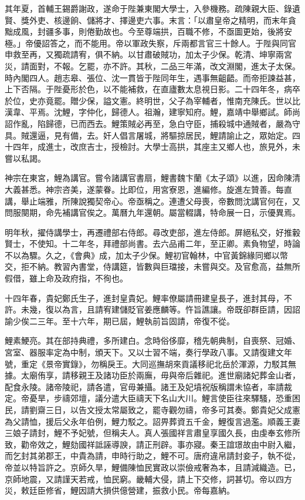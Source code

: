 \begin{pinyinscope}
其年夏，首輔王錫爵謝政，遂命于陛兼東閣大學士，入參機務。疏陳親大臣、錄遺賢、獎外吏、核邊餉、儲將才、擇邊吏六事。末言：「以肅皇帝之精明，而末年貪黜成風，封疆多事，則倦勤故也。今至尊端拱，百職不修，不亟圖更始，後將安極。」帝優詔答之，而不能用。帝以軍政失察，斥兩都言官三十餘人。于陛與同官申救至再，又獨疏請宥，俱不納。以甘肅破賊功，加太子少保。乾清、坤寧兩宮災，請面對，不報。乞罷，亦不許。其秋，二品三年滿，改文淵閣，進太子太保。時內閣四人。趙志皋、張位、沈一貫皆于陛同年生，遇事無齟齬。而帝拒諫益甚，上下否隔。于陛憂形於色，以不能補救，在直廬數太息視日影。二十四年冬，病卒於位，史亦竟罷。贈少保，謚文憲。終明世，父子為宰輔者，惟南充陳氏。世以比漢韋、平焉。沈鯉，字仲化，歸德人。祖瀚，建寧知府。鯉，嘉靖中舉鄉試。師尚詔作亂，陷歸德，已而西去。鯉策賊必再至，急白守臣，捕殺城中通賊者，嚴為守具。賊還逼，見有備，去。奸人倡言屠城，將驅掠居民，鯉請諭止之，眾始定。四十四年，成進士，改庶吉士，授檢討。大學士高拱，其座主又鄉人也，旅見外，未嘗以私謁。

神宗在東宮，鯉為講官。嘗令諸講官書扇，鯉書魏卞蘭《太子頌》以進，因命陳清大義甚悉。神宗咨美，遂蒙眷。比即位，用宮寮恩，進編修。旋進左贊善。每直講，舉止端雅，所陳說獨契帝心。帝亟稱之。連遭父母喪，帝數問沈講官何在，又問服闋期，命先補講官俟之。萬曆九年還朝。屬當輟講，特命展一日，示優異焉。

明年秋，擢侍講學士，再遷禮部右侍郎。尋改吏部，進左侍郎。屏絕私交，好推轂賢士，不使知。十二年冬，拜禮部尚書。去六品甫二年，至正卿。素負物望，時論不以為驟。久之，《會典》成，加太子少保。鯉初官翰林，中官黃錦緣同鄉以幣交，拒不納。教習內書堂，侍講筵，皆數與巨璫接，未嘗與交。及官愈高，益無所假借，雖上命及政府指，不徇也。

十四年春，貴妃鄭氏生子，進封皇貴妃。鯉率僚屬請冊建皇長子，進封其母，不許。未幾，復以為言，且請宥建儲貶官姜應麟等。忤旨譙讓。帝既卻群臣請，因詔諭少俟二三年。至十六年，期已屆，鯉執前旨固請，帝復不從。

鯉素鯁亮。其在部持典禮，多所建白。念時俗侈靡，稽先朝典制，自喪祭、冠婚、宮室、器服率定為中制，頒天下。又以士習不端，奏行學政八事。又請復建文年號，重定《景帝實錄》，勿稱戾王。大同巡撫胡來貢議移祀北岳於渾源，力駁其無據。太廟侑享，請移親王及諸功臣於兩廡，毋與帝后雜祀。進世廟諸妃葬金山者，配食永陵。諸帝陵祀，請各遣，官毋兼攝。諸王及妃墳祝版稱謂未協者，率請裁定。帝憂旱，步禱郊壇，議分遣大臣禱天下名山大川。鯉言使臣往來驛騷，恐重困民，請劉齋三日，以告文授太常屬致之，罷寺觀勿禱，帝多可其奏。鄭貴妃父成憲為父請恤，援后父永年伯例，鯉力駁之。詔畀葬資五千金，鯉復言過濫。順義王妻三娘子請封，鯉不予妃號，但稱夫人。真人張國祥言肅皇享國久長，由虔奉玄修所致，勸帝效之，鯉劾國祥詆誣導諛，請正刑辟。事亦寢。秦王誼璟故由中尉入繼，而乞封其弟郡王，中貴為請，申時行助之，鯉不可。唐府違帛請封妾子，執不從，帝並以特旨許之。京師久旱，鯉備陳恤民實政以崇儉戒奢為本，且請減織造。已，京師地震，又請謹天若戒，恤民窮。畿輔大侵，請上下交修，詞甚切。帝以四方災，敕廷臣修省，鯉因請大損供億營建，振救小民。帝每嘉納。


\end{pinyinscope}
